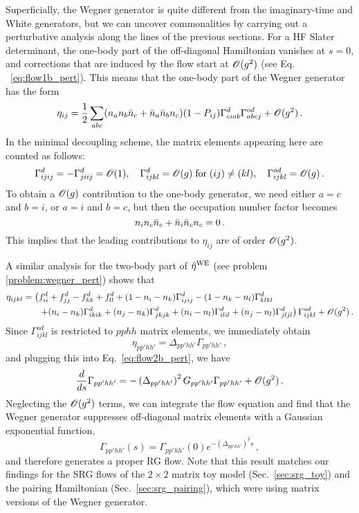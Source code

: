 Superficially, the Wegner generator is quite different from the imaginary-time 
and White generators, but we can uncover commonalities by carrying out a 
perturbative analysis along the lines of the previous sections. For a HF 
Slater determinant, the one-body part of the off-diagonal Hamiltonian vanishes 
at $s=0$, and corrections that are induced by the flow start at $\mathcal{O}(g^2)$
(see Eq. ~\eqref{eq:flow1b_pert}). This means that the one-body part of
the Wegner generator has the form
\begin{equation}
  \eta_{ij} = \frac{1}{2} 
      \sum_{abc}(n_an_b\bar{n}_c+\bar{n}_a\bar{n}_bn_c) (1-P_{ij})\Gamma^d_{ciab}\Gamma^{od}_{abcj}
      + \mathcal{O}(g^2)\,.
\end{equation}
In the minimal decoupling scheme, the matrix elements appearing here are
counted as follows:
\begin{equation}
  \Gamma^d_{ijij} = -\Gamma^d_{jiij} = \mathcal{O}(1), \quad \Gamma^d_{ijkl} = \mathcal{O}(g)\; \text{for}\; (ij)\neq(kl), 
  \quad \Gamma^{od}_{ijkl} = \mathcal{O}(g)\,.
\end{equation}
To obtain a $\mathcal{O}(g)$ contribution to the one-body generator, we need
either $a=c$ and $b=i$, or $a=i$ and $b=c$, but then the occupation number
factor becomes
\begin{equation}
  n_{i}n_{c}\bar{n}_c + \bar{n}_{i} \bar{n}_{c} n_c = 0\,.
\end{equation}
This implies that the leading contributions to $\eta_{ij}$ are of order $\mathcal{O}(g^2)$.

A similar analysis for the two-body part of $\hat{\eta}^\text{WE}$ (see problem
\ref{problem:wegner_pert}) shows that
\begin{align}
  \eta_{ijkl}
    &=\left(f^d_{ii} + f^d_{jj} - f^d_{kk} + f^d_{ll} + (1-n_i-n_k)\Gamma^d_{ijij} - (1-n_k-n_l)\Gamma^d_{klkl} 
    \right.\notag\\
    &\hphantom{=}\left.\quad
    + (n_i-n_k) \Gamma^d_{ikik} + (n_j-n_k) \Gamma^d_{jkjk} + (n_i-n_l) \Gamma^d_{ilil} + (n_j-n_l) \Gamma^d_{jljl}
  \right)\Gamma^{od}_{ijkl}
  +\OC(g^2)\,.
  \label{eq:wegner2b_pert}
\end{align}
Since $\Gamma^{od}_{ijkl}$ is restricted to $pphh$ matrix elements, we immediately
obtain
\begin{equation}
  \eta_{pp'hh'} = \Delta_{pp'hh'}\Gamma_{pp'hh'}\,,
\end{equation}
and plugging this into Eq.~\eqref{eq:flow2b_pert}, we have
\begin{equation}
     \frac{d {}} {d {s}} \Gamma_{pp'hh'} 
  =-\left(\Delta_{pp'hh'}\right)^2G_{pp'hh'}\Gamma_{pp'hh'} + \mathcal{O}(g^2)\,.
\end{equation}
Neglecting the $\mathcal{O}(g^2)$ terms, we can integrate the flow equation
and find that the Wegner generator suppresses off-diagonal matrix
elements with a Gaussian exponential function,
\begin{equation}
  \Gamma_{pp'hh'}(s) = \Gamma_{pp'hh'}(0) e^{-(\Delta_{pp'hh'})^2s}\,,
\end{equation}
and therefore generates a proper RG flow. Note that this result matches 
our findings for the SRG flows of the 
$2\times2$ matrix toy model (Sec.~\ref{sec:srg_toy}) and the pairing 
Hamiltonian (Sec.~\ref{sec:srg_pairing}), which were using matrix 
versions of the Wegner generator.

